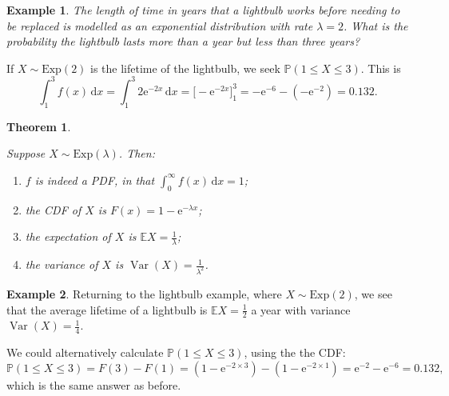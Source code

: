 \documentclass[
  a4paper,
]{book}
\providecommand{\tightlist}{%
  \setlength{\itemsep}{0pt}\setlength{\parskip}{0pt}}
\newtheorem{theorem}{Theorem}[chapter]
\theoremstyle{definition}
\theoremstyle{definition}
\newtheorem{example}{Example}[chapter]
\theoremstyle{definition}
\theoremstyle{definition}
\theoremstyle{remark}
\begin{document}
\begin{example}
\emph{The length of time in years that a lightbulb works before needing to be replaced is modelled as an exponential distribution with rate \(\lambda = 2\). What is the probability the lightbulb lasts more than a year but less than three years?}

If \(X \sim \text{Exp}(2)\) is the lifetime of the lightbulb, we seek \(\mathbb P(1 \leq X \leq 3)\). This is
\[ \int_{1}^3 f(x)\, \mathrm{d}x = \int_1^3 2 \mathrm e^{-2x} \, \mathrm dx = \big[ -\mathrm e^{-2x} \big]_1^3 = -\mathrm e^{-6} -(-\mathrm e^{-2}) = 0.132.  \]
\end{example}

\begin{theorem}
\protect\hypertarget{thm:exp-prop}{}\label{thm:exp-prop}

Suppose \(X \sim \text{Exp}(\lambda)\). Then:

\begin{enumerate}
\def\labelenumi{\arabic{enumi}.}
\tightlist
\item
  \(f\) is indeed a PDF, in that \(\displaystyle\int_0^\infty f(x)\,\mathrm{d}x = 1\);
\item
  the CDF of \(X\) is \(F(x) = 1 - \mathrm{e}^{-\lambda x}\);
\item
  the expectation of \(X\) is \(\mathbb EX = \displaystyle\frac{1}{\lambda}\);
\item
  the variance of \(X\) is \(\operatorname{Var}(X) = \displaystyle\frac{1}{\lambda^2}\).
\end{enumerate}

\end{theorem}

\begin{example}
Returning to the lightbulb example, where \(X \sim \text{Exp}(2)\), we see that the average lifetime of a lightbulb is \(\mathbb EX = \frac12\) a year with variance \(\operatorname{Var}(X) = \frac14\).

We could alternatively calculate \(\mathbb P(1 \leq X \leq 3)\), using the the CDF:
\[ \mathbb P(1 \leq X \leq 3) = F(3) - F(1) = (1 - \mathrm{e}^{-2\times 3}) - (1 - \mathrm{e}^{-2\times 1}) = \mathrm{e}^{-2} - \mathrm{e}^{-6} = 0.132 , \]
which is the same answer as before.
\end{example}
\end{document}
